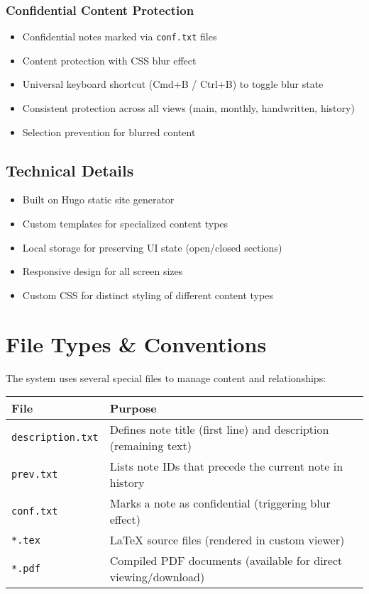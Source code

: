 \documentclass{article}
\begin{document}
\subsubsection{Confidential Content Protection}
\begin{itemize}
  \item Confidential notes marked via \texttt{conf.txt} files
  \item Content protection with CSS blur effect
  \item Universal keyboard shortcut (Cmd+B / Ctrl+B) to toggle blur state
  \item Consistent protection across all views (main, monthly, handwritten, history)
  \item Selection prevention for blurred content
\end{itemize}

\subsection{Technical Details}
\begin{itemize}
  \item Built on Hugo static site generator
  \item Custom templates for specialized content types
  \item Local storage for preserving UI state (open/closed sections)
  \item Responsive design for all screen sizes
  \item Custom CSS for distinct styling of different content types
\end{itemize}

\section{File Types \& Conventions}

The system uses several special files to manage content and relationships:

\begin{tabular}{|l|l|}
\hline
\textbf{File} & \textbf{Purpose} \\
\hline
\texttt{description.txt} & Defines note title (first line) and description (remaining text) \\
\texttt{prev.txt} & Lists note IDs that precede the current note in history \\
\texttt{conf.txt} & Marks a note as confidential (triggering blur effect) \\
\texttt{*.tex} & LaTeX source files (rendered in custom viewer) \\
\texttt{*.pdf} & Compiled PDF documents (available for direct viewing/download) \\
\hline
\end{tabular}
\end{document}
